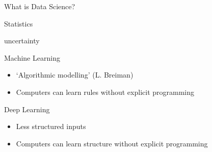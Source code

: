 \begin{frame}{What is Data Science?}
{\begin{block}{Statistics}
\begin{itemize}
                      uncertainty
            \end{itemize}
        \end{block}
        \vfill
        \begin{block}{Machine Learning}\vspace{-0.25em}
            \begin{itemize}
                \item `Algorithmic modelling' (L. Breiman)
                \item Computers can \alert{learn rules} without explicit
                      programming
            \end{itemize}
        \end{block}
        \vfill
        \begin{block}{Deep Learning}\vspace{-0.25em}
            \begin{itemize}
                \item Less structured inputs
                \item Computers can \alert{learn structure} without explicit
                      programming
            \end{itemize}
        \end{block}}
\end{frame}
